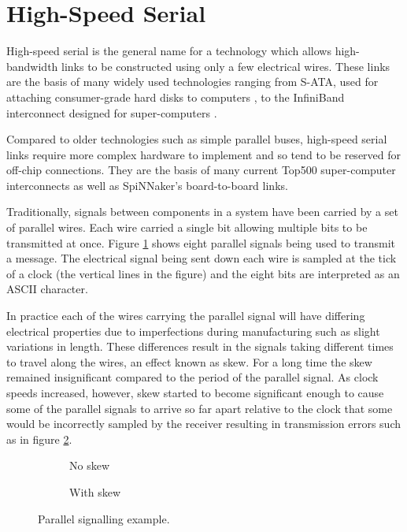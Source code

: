 	\break
	\section{High-Speed Serial}
		
		\label{sec:high-speed-serial}
		
		High-speed serial is the general name for a technology which allows
		high-bandwidth links to be constructed using only a few electrical wires.
		These links are the basis of many widely used technologies ranging from
		S-ATA, used for attaching consumer-grade hard disks to computers
		\cite{sataio}, to the InfiniBand interconnect designed for super-computers
		\cite{infinibandta}.
		
		Compared to older technologies such as simple parallel buses, high-speed
		serial links require more complex hardware to implement and so tend to be
		reserved for off-chip connections. They are the basis of many current Top500
		super-computer interconnects as well as SpiNNaker's board-to-board links.
		
		Traditionally, signals between components in a system have been carried by a
		set of parallel wires. Each wire carried a single bit allowing multiple bits
		to be transmitted at once. Figure \ref{fig:parallel-example-no-skew} shows
		eight parallel signals being used to transmit a message. The electrical
		signal being sent down each wire is sampled at the tick of a clock (the
		vertical lines in the figure) and the eight bits are interpreted as an ASCII
		character.
		
		In practice each of the wires carrying the parallel signal will have
		differing electrical properties due to imperfections during manufacturing
		such as slight variations in length. These differences result in the
		signals taking different times to travel along the wires, an effect known
		as skew. For a long time the skew remained insignificant compared to the
		period of the parallel signal.  As clock speeds increased, however, skew
		started to become significant enough to cause some of the parallel signals
		to arrive so far apart relative to the clock that some would be
		incorrectly sampled by the receiver resulting in transmission errors such
		as in figure \ref{fig:parallel-example-skew}.
		
		\begin{figure}
			\begin{subfigure}[b]{0.49\textwidth}
				\center
				
				\caption{No skew}
				\label{fig:parallel-example-no-skew}
			\end{subfigure}
			\begin{subfigure}[b]{0.49\textwidth}
				\center
				
				\caption{With skew}
				\label{fig:parallel-example-skew}
			\end{subfigure}
			
			\caption{Parallel signalling example.}
			\label{fig:parallel-example}
		\end{figure}
		

